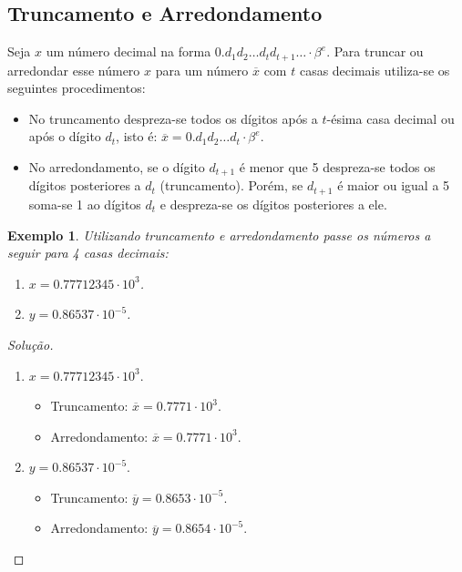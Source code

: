 \documentclass[
	12pt,				%
	openright,			%
	twoside,			%
	a4paper,			%
	english,			%
	french,				%
	brazil,				%
	sumario=tradicional
]{abntex2}
\newtheorem{example}{Exemplo}
\newenvironment{solution}{
	\begin{proof}[Solução]
}{\end{proof}}
\numberwithin{example}{chapter}
\numberwithin{remark}{chapter}
\numberwithin{definition}{chapter}
\numberwithin{figure}{chapter}
\begin{document}
\subsection{Truncamento e Arredondamento}

Seja $x$ um número decimal na forma $0.d_1 d_2 \dots d_t d_{t+1} \dots \cdot \beta ^e$. Para truncar ou arredondar esse número $x$ para um número $\overline{x}$ com $t$ casas decimais utiliza-se os seguintes procedimentos:
\begin{itemize}
    \item No truncamento despreza-se todos os dígitos após a $t$-ésima casa decimal ou após o dígito $d_t$, isto é: $\overline{x}=0.d_1 d_2 \dots d_t \cdot \beta^e$.

    \item No arredondamento, se o dígito $d_{t+1}$ é menor que 5 despreza-se todos os dígitos posteriores a $d_t$ (truncamento). Porém, se $d_{t+1}$ é maior ou igual a 5 soma-se 1 ao dígitos $d_t$ e despreza-se os dígitos posteriores a ele.
\end{itemize}

\begin{example}
    Utilizando truncamento e arredondamento passe os números a seguir para 4 casas decimais:
	\begin{enumerate}
        \item $x=0.77712345\cdot 10^3$.
        \item $y=0.86537\cdot 10^{-5}$.
	\end{enumerate}
\end{example}
\begin{solution}\hfill
    \begin{enumerate}
        \item $x=0.77712345\cdot 10^3$.
        	\begin{itemize}
			    \item Truncamento: $\overline{x}=0.7771\cdot 10^3$.
			    \item Arredondamento: $\overline{x}=0.7771\cdot 10^3$.
			\end{itemize}

        \item $y=0.86537\cdot 10^{-5}$.
        	\begin{itemize}
			    \item Truncamento: $\overline{y}=0.8653\cdot 10^{-5}$.
			    \item Arredondamento: $\overline{y}=0.8654\cdot 10^{-5}$.
			\end{itemize}
    \end{enumerate}
\end{solution}
\end{document}
